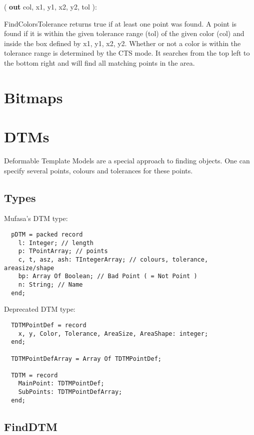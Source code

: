 \documentclass[a4paper]{report}
\begin{document}
\pfunc {}( \textbf{out }  \pvname
{col, x1, y1, x2, y2, tol} ): 

FindColorsTolerance returns true if at least one point was found. A point is found if it is within the
given tolerance range (tol) of the given color (col) and inside the box defined by x1, y1, x2, y2.
Whether or not a color is within the tolerance range is determined by the CTS mode.
It searches from the top left to the bottom right and will find all matching points in the area.

\section{Bitmaps}


\section{DTMs}

Deformable Template Models are a special approach to finding
objects. One can specify several points, colours and tolerances
for these points.

\subsection{Types}

Mufasa's DTM type:

\begin{verbatim}
  pDTM = packed record
    l: Integer; // length
    p: TPointArray; // points
    c, t, asz, ash: TIntegerArray; // colours, tolerance, areasize/shape
    bp: Array Of Boolean; // Bad Point ( = Not Point )
    n: String; // Name
  end;              
\end{verbatim}

Deprecated DTM type:

\begin{verbatim}
  TDTMPointDef = record
    x, y, Color, Tolerance, AreaSize, AreaShape: integer;
  end;

  TDTMPointDefArray = Array Of TDTMPointDef;

  TDTM = record
    MainPoint: TDTMPointDef;
    SubPoints: TDTMPointDefArray;
  end;    
\end{verbatim}

\subsection{FindDTM}
\end{document}
